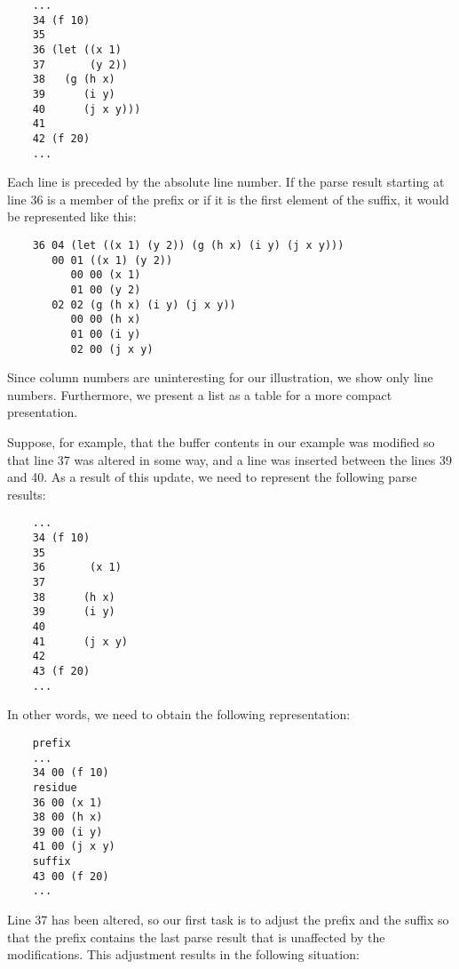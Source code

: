 \vspace{-5mm}
{\small\begin{verbatim}
    ...
    34 (f 10)
    35
    36 (let ((x 1)
    37       (y 2))
    38   (g (h x)
    39      (i y)
    40      (j x y)))
    41
    42 (f 20)
    ...
\end{verbatim}}
\vspace{-5mm}

Each line is preceded by the absolute line number.  If the parse
result starting at line 36 is a member of the prefix or if it is the
first element of the suffix, it would be represented like this:

\vspace{-5mm}
{\small\begin{verbatim}
    36 04 (let ((x 1) (y 2)) (g (h x) (i y) (j x y)))
       00 01 ((x 1) (y 2))
          00 00 (x 1)
          01 00 (y 2)
       02 02 (g (h x) (i y) (j x y))
          00 00 (h x)
          01 00 (i y)
          02 00 (j x y)
\end{verbatim}}
\vspace{-5mm}

Since column numbers are uninteresting for our illustration, we
show only line numbers.  Furthermore, we present a list as a table for
a more compact presentation.

Suppose, for example, that the buffer contents in our example was
modified so that line 37 was altered in some way, and a line was
inserted between the lines 39 and 40.  As a result of this update, we
need to represent the following parse results:

\vspace{-5mm}
{\small\begin{verbatim}
    ...
    34 (f 10)
    35
    36       (x 1)
    37
    38      (h x)
    39      (i y)
    40
    41      (j x y)
    42
    43 (f 20)
    ...
\end{verbatim}}
\vspace{-5mm}

In other words, we need to obtain the following representation:

\vspace{-5mm}
{\small\begin{verbatim}
    prefix
    ...
    34 00 (f 10)
    residue
    36 00 (x 1)
    38 00 (h x)
    39 00 (i y)
    41 00 (j x y)
    suffix
    43 00 (f 20)
    ...
\end{verbatim}}
\vspace{-5mm}

Line 37 has been altered, so our first task is to adjust the prefix
and the suffix so that the prefix contains the last parse result that
is unaffected by the modifications.  This adjustment results in the
following situation:

